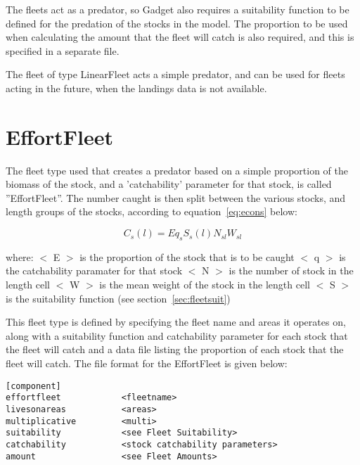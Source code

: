 \documentclass[10pt,twoside]{book}
\begin{document}
\bigskip
The fleets act as a predator, so Gadget also requires a suitability function to be defined for the predation of the stocks in the model.  The proportion to be used when calculating the amount that the fleet will catch is also required, and this is specified in a separate file.

\bigskip
The fleet of type LinearFleet acts a simple predator, and can be used for fleets acting in the future, when the landings data is not available.

\section{EffortFleet}\label{sec:effortfleet}
The fleet type used that creates a predator based on a simple proportion of the biomass of the stock, and a 'catchability' parameter for that stock, is called ''EffortFleet''.  The number caught is then split between the various stocks, and length groups of the stocks, according to equation~\ref{eq:econs} below:

\begin{equation}\label{eq:econs}
C_{s}(l) = E q_{s} S_{s}(l) N_{sl} W_{sl}
\end{equation}

where:\newline
$<$ E $>$ is the proportion of the stock that is to be caught\newline
$<$ q $>$ is the catchability paramater for that stock\newline
$<$ N $>$ is the number of stock in the length cell\newline
$<$ W $>$ is the mean weight of the stock in the length cell\newline
$<$ S $>$ is the suitability function (see section~\ref{sec:fleetsuit})

\bigskip
This fleet type is defined by specifying the fleet name and areas it operates on, along with a suitability function and catchability parameter for each stock that the fleet will catch and a data file listing the proportion of each stock that the fleet will catch.  The file format for the EffortFleet is given below:

{\small\begin{verbatim}
[component]
effortfleet            <fleetname>
livesonareas           <areas>
multiplicative         <multi>
suitability            <see Fleet Suitability>
catchability           <stock catchability parameters>
amount                 <see Fleet Amounts>
\end{verbatim}}
\end{document}
